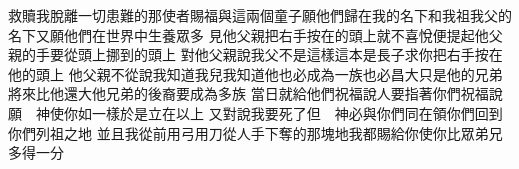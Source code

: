 救贖我脫離一切患難的那使者\chientien 賜福與這兩個童子\chientien 願他們歸在我的名下\chientien 和我祖\chientien 我父的名下\chientien 又願他們在世界中生養眾多\chuan 
{}見他父親把右手按在的頭上\chientien 就不喜悅\chientien 便提起他父親的手\chientien 要從頭上挪到的頭上\chuan 
{}對他父親說\chientien 我父不是這樣\chientien 這本是長子\chientien 求你把右手按在他的頭上\chuan 
{}他父親不從\chientien 說\chientien 我知道\chientien 我兒\chientien 我知道\chientien 他也必成為一族\chientien 也必昌大\chuan 只是他的兄弟將來比他還大\chientien 他兄弟的後裔要成為多族\chuan 
{}當日就給他們祝福\chientien 說\chientien{}人要指著你們祝福\chientien 說\chientien 願　神使你如一樣\yuentien 於是立在以上\chuan 
{}又對說\chientien 我要死了\chientien 但　神必與你們同在\chientien 領你們回到你們列祖之地\chuan 
{}並且我從前用弓用刀\chientien 從人手下奪的那塊地\chientien 我都賜給你\chientien 使你比眾弟兄多得一分\chuan 
